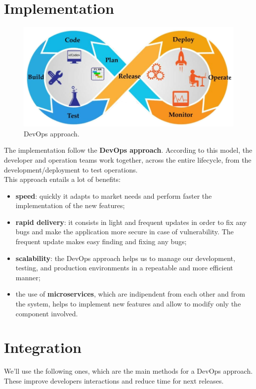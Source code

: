 \section{Implementation}

\begin{figure}[H]
  \label{fig:devops}
  \centering
  \includegraphics[scale=0.35]{images/devops.png}
  \caption{DevOps approach.}
\end{figure}

The implementation follow the \textbf{DevOps approach}.
According to this model, the developer and operation teams work together, across the entire lifecycle, from the development/deployment to test operations.\\
This approach entails a lot of benefits:
\begin{itemize}
\item \textbf{speed}: quickly it adapts to market needs and perform faster the implementation of the new features; 
\item \textbf{rapid delivery}: it consists in light and frequent updates in order to fix any bugs and make the application more secure in case of vulnerability.
The frequent update makes easy finding and fixing any bugs;
\item \textbf{scalability}: the DevOps approach helps us to manage our development, testing, and production environments in a repeatable and more efficient manner;
\item the use of \textbf{microservices}, which are indipendent from each other and from the system, helps to implement new features and allow to modify only the component involved.
\end{itemize}



\section{Integration}
We'll use the following ones, which are the main methods for a DevOps approach. These improve developers interactions and reduce time for next releases.
\bigskip

